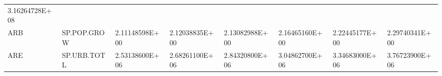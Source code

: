 \documentclass[]{article}
\begin{document}
\begin{longtable}[]{@{}llllllll@{}}
\begin{minipage}[t]{0.11\columnwidth}
3.16264728E+08\strut
\end{minipage}\tabularnewline
\begin{minipage}[t]{0.06\columnwidth}\raggedright
ARB\strut
\end{minipage} & \begin{minipage}[t]{0.08\columnwidth}\raggedright
SP.POP.GROW\strut
\end{minipage} & \begin{minipage}[t]{0.11\columnwidth}\raggedright
2.11148598E+00\strut
\end{minipage} & \begin{minipage}[t]{0.11\columnwidth}\raggedright
2.12038835E+00\strut
\end{minipage} & \begin{minipage}[t]{0.11\columnwidth}\raggedright
2.13082988E+00\strut
\end{minipage} & \begin{minipage}[t]{0.11\columnwidth}\raggedright
2.16465160E+00\strut
\end{minipage} & \begin{minipage}[t]{0.11\columnwidth}\raggedright
2.22445177E+00\strut
\end{minipage} & \begin{minipage}[t]{0.11\columnwidth}\raggedright
2.29740341E+00\strut
\end{minipage}\tabularnewline
\begin{minipage}[t]{0.06\columnwidth}\raggedright
ARE\strut
\end{minipage} & \begin{minipage}[t]{0.08\columnwidth}\raggedright
SP.URB.TOTL\strut
\end{minipage} & \begin{minipage}[t]{0.11\columnwidth}\raggedright
2.53138600E+06\strut
\end{minipage} & \begin{minipage}[t]{0.11\columnwidth}\raggedright
2.68261100E+06\strut
\end{minipage} & \begin{minipage}[t]{0.11\columnwidth}\raggedright
2.84320800E+06\strut
\end{minipage} & \begin{minipage}[t]{0.11\columnwidth}\raggedright
3.04862700E+06\strut
\end{minipage} & \begin{minipage}[t]{0.11\columnwidth}\raggedright
3.34683000E+06\strut
\end{minipage} & \begin{minipage}[t]{0.11\columnwidth}\raggedright
3.76723900E+06\strut
\end{minipage}\tabularnewline
\bottomrule
\end{longtable}
\end{document}
